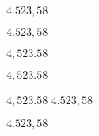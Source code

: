 \documentclass[english,ngerman]{tudscrartcl}%
\begin{document}
\mathswapoff
\(4.523,58\)
\mathswapon

\(4.523,58\)

\(4,523.58\)

\begingroup
  \commaswap{\,}
  \dotswap{,}
  \(4,523.58\)
\endgroup

\begingroup
  \(4,523.58\)\newline
  \(4.523,58\)
\endgroup

\begingroup
  \dotswap{\,}
  \(4.523,58\)
\endgroup
\end{document}
